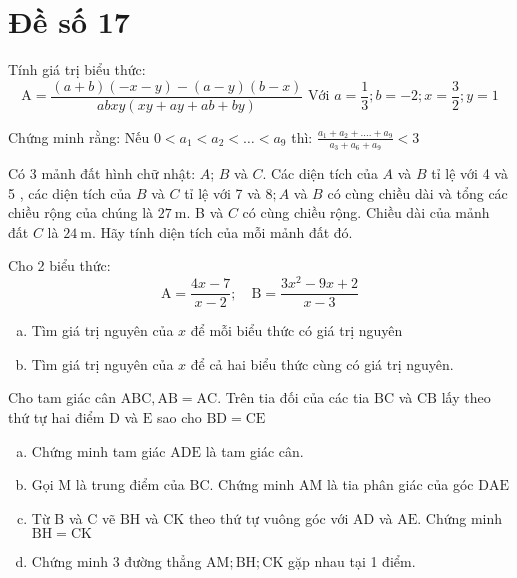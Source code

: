 \onehalfspacing
\section{Đề số 17}

\begin{bt} 
    Tính giá trị biểu thức:
$$
\mathrm{A}=\frac{(a+b)(-x-y)-(a-y)(b-x)}{a b x y(x y+a y+a b+b y)} \text { Với } a=\frac{1}{3} ; b=-2 ; x=\frac{3}{2} ; y=1
$$
	\loigiai{} 
\end{bt}

\begin{bt}
	Chứng minh rằng: Nếu $0<a_1<a_2<\ldots<a_9$ thì: $\frac{a_1+a_2+\ldots .+a_9}{a_3+a_6+a_9}<3$
	\loigiai{} 
\end{bt}

\begin{bt}
	Có 3 mảnh đất hình chữ nhật: $A$; $B$ và $C$. Các diện tích của $A$ và $B$ tỉ lệ với 4 và 5 , các diện tích của $B$ và $C$ tỉ lệ với 7 và $8 ; A$ và $B$ có cùng chiều dài và tổng các chiều rộng của chúng là $27 \mathrm{~m}$. B và $C$ có cùng chiều rộng. Chiều dài của mảnh đất $C$ là $24 \mathrm{~m}$. Hãy tính diện tích của mỗi mảnh đất đó.
	\loigiai{}
\end{bt}

\begin{bt}
    Cho 2 biểu thức:
$$
\mathrm{A}=\frac{4 x-7}{x-2} ; \quad \mathrm{B}=\frac{3 x^2-9 x+2}{x-3}
$$
    \begin{enumerate}[a.]
        \item Tìm giá trị nguyên của $x$ để mỗi biểu thức có giá trị nguyên
        \item Tìm giá trị nguyên của $x$ để cả hai biểu thức cùng có giá trị nguyên.
    \end{enumerate}
\loigiai{}
\end{bt}

\begin{bt}
    Cho tam giác cân $\mathrm{ABC}, \mathrm{AB}=\mathrm{AC}$. Trên tia đối của các tia $\mathrm{BC}$ và $\mathrm{CB}$ lấy theo thứ tự hai điểm $\mathrm{D}$ và $\mathrm{E}$ sao cho $\mathrm{BD}=\mathrm{CE}$
    \begin{enumerate}[a.]
        \item Chứng minh tam giác $\mathrm{ADE}$ là tam giác cân.
        \item Gọi $\mathrm{M}$ là trung điểm của $\mathrm{BC}$. Chứng minh $\mathrm{AM}$ là tia phân giác của góc $\mathrm{DAE}$
        \item Từ $\mathrm{B}$ và $\mathrm{C}$ vẽ $\mathrm{BH}$ và $\mathrm{CK}$ theo thứ tự vuông góc với $\mathrm{AD}$ và $\mathrm{AE}$. Chứng minh $\mathrm{BH}=\mathrm{CK}$
        \item Chứng minh 3 đường thẳng $\mathrm{AM} ; \mathrm{BH} ; \mathrm{CK}$ gặp nhau tại 1 điểm.
    \end{enumerate}
\loigiai{}
\end{bt}


